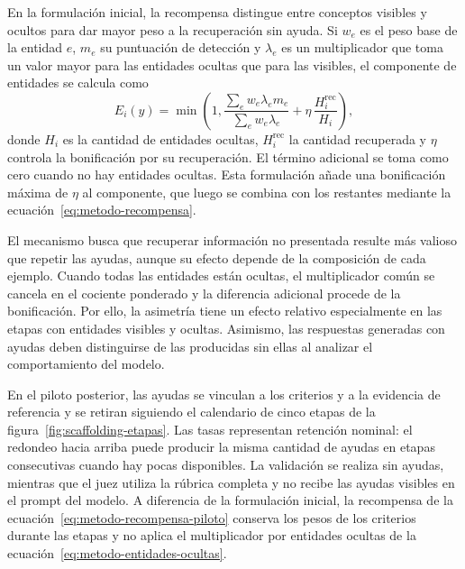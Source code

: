 En la formulación inicial, la recompensa distingue entre conceptos visibles y ocultos para dar mayor peso a la recuperación sin ayuda. Si $w_e$ es el peso base de la entidad $e$, $m_e$ su puntuación de detección y $\lambda_e$ es un multiplicador que toma un valor mayor para las entidades ocultas que para las visibles, el componente de entidades se calcula como
\begin{equation}
E_i(y)=\min\!\left(1,
\frac{\sum_e w_e\lambda_e m_e}{\sum_e w_e\lambda_e}
+\eta\,\frac{H_i^{\mathrm{rec}}}{H_i}\right),
\label{eq:metodo-entidades-ocultas}
\end{equation}
donde $H_i$ es la cantidad de entidades ocultas, $H_i^{\mathrm{rec}}$ la cantidad recuperada y $\eta$ controla la bonificación por su recuperación. El término adicional se toma como cero cuando no hay entidades ocultas. Esta formulación añade una bonificación máxima de $\eta$ al componente, que luego se combina con los restantes mediante la ecuación~\ref{eq:metodo-recompensa}.

El mecanismo busca que recuperar información no presentada resulte más valioso que repetir las ayudas, aunque su efecto depende de la composición de cada ejemplo. Cuando todas las entidades están ocultas, el multiplicador común se cancela en el cociente ponderado y la diferencia adicional procede de la bonificación. Por ello, la asimetría tiene un efecto relativo especialmente en las etapas con entidades visibles y ocultas. Asimismo, las respuestas generadas con ayudas deben distinguirse de las producidas sin ellas al analizar el comportamiento del modelo.


En el piloto posterior, las ayudas se vinculan a los criterios y a la evidencia de referencia y se retiran siguiendo el calendario de cinco etapas de la figura~\ref{fig:scaffolding-etapas}. Las tasas representan retención nominal: el redondeo hacia arriba puede producir la misma cantidad de ayudas en etapas consecutivas cuando hay pocas disponibles. La validación se realiza sin ayudas, mientras que el juez utiliza la rúbrica completa y no recibe las ayudas visibles en el prompt del modelo. A diferencia de la formulación inicial, la recompensa de la ecuación~\ref{eq:metodo-recompensa-piloto} conserva los pesos de los criterios durante las etapas y no aplica el multiplicador por entidades ocultas de la ecuación~\ref{eq:metodo-entidades-ocultas}.
